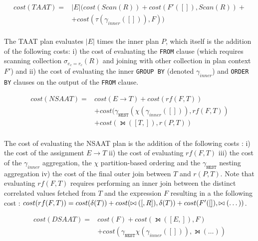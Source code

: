 
\begin{equation*}
\begin{aligned}
cost(TAAT) = & |E| (cost(Scan(R)) + cost(F'([]), Scan(R)) + \\
                    & + cost(\tau(\gamma_{inner}([])), F)) \\
\end{aligned}
\end{equation*}

The TAAT plan evaluates $|E|$ times the inner plan $P$, which itself is the addition of the following costs: i) the cost of evaluating the \texttt{FROM} clause (which requires scanning collection $\sigma_{e_c = r_c}(R)$ and joining with other collection in plan context $F'$) and ii) the cost of evaluating the inner \texttt{GROUP BY} (denoted $\gamma_{inner}$) and \texttt{ORDER BY} clauses on the output of the \texttt{FROM} clause.

\begin{equation*}
\begin{aligned}
cost(NSAAT) = & cost(E \rightarrow T) + cost(rf(F,T))   \\
                    & + cost(\gamma_{\texttt{NEST}}(\chi(\gamma_{inner}([])), rf(F,T)) \\
                    & + cost(\leftouterjoin([T,]),r(P,T))  \\
\end{aligned}
\end{equation*}

The cost of evaluating the NSAAT plan is the addition of the following costs : i) the cost of the assignment $E \rightarrow T$ ii) the cost of evaluating $rf(F,T)$ iii) the cost of the $\gamma_{inner}$ aggregation, the $\chi$ partition-based ordering and the $\gamma_{\texttt{NEST}}$ nesting aggregation iv) the cost of the final outer join between $T$ and $r(P,T)$. Note that evaluating $rf(F,T)$ requires performing an inner join between the distinct correlated values fetched from $T$ and the expression $F$ resulting in a the following cost : $cost(rf(F,T)) = cost(\delta(T)) + cost(\bowtie([,R]),\delta(T)) + cost(F'([]), \bowtie(\dots))$. 

\begin{equation*}
\begin{aligned}
cost(DSAAT) = & cost(F) + cost(\leftouterjoin([E,]),F) \\
                   & + cost(\gamma_{\texttt{NEST}}\chi(\gamma_{inner}([])), \leftouterjoin(
                   \dots)) \\
\end{aligned}
\end{equation*}

